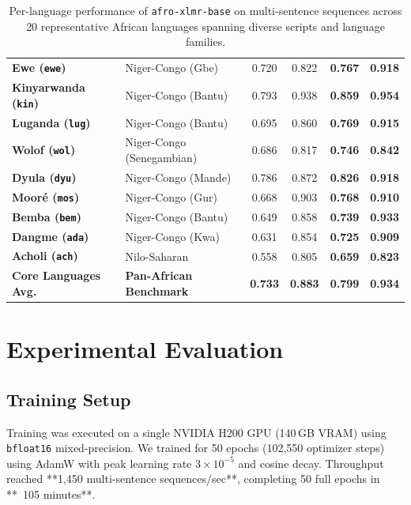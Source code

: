 \documentclass[11pt,a4paper]{article}
\begin{document}
\begin{table}[t]
\begin{tabularx}{\linewidth}{llcccc}
\textbf{Ewe (\texttt{ewe})} & Niger-Congo (Gbe) & 0.720 & 0.822 & \textbf{0.767} & \textbf{0.918} \\
\textbf{Kinyarwanda (\texttt{kin})} & Niger-Congo (Bantu) & 0.793 & 0.938 & \textbf{0.859} & \textbf{0.954} \\
\textbf{Luganda (\texttt{lug})} & Niger-Congo (Bantu) & 0.695 & 0.860 & \textbf{0.769} & \textbf{0.915} \\
\textbf{Wolof (\texttt{wol})} & Niger-Congo (Senegambian) & 0.686 & 0.817 & \textbf{0.746} & \textbf{0.842} \\
\textbf{Dyula (\texttt{dyu})} & Niger-Congo (Mande) & 0.786 & 0.872 & \textbf{0.826} & \textbf{0.918} \\
\textbf{Moor\'{e} (\texttt{mos})} & Niger-Congo (Gur) & 0.668 & 0.903 & \textbf{0.768} & \textbf{0.910} \\
\textbf{Bemba (\texttt{bem})} & Niger-Congo (Bantu) & 0.649 & 0.858 & \textbf{0.739} & \textbf{0.933} \\
\textbf{Dangme (\texttt{ada})} & Niger-Congo (Kwa) & 0.631 & 0.854 & \textbf{0.725} & \textbf{0.909} \\
\textbf{Acholi (\texttt{ach})} & Nilo-Saharan & 0.558 & 0.805 & \textbf{0.659} & \textbf{0.823} \\
\midrule
\textbf{Core Languages Avg.} & \textbf{Pan-African Benchmark} & \textbf{0.733} & \textbf{0.883} & \textbf{0.799} & \textbf{0.934} \\
\bottomrule
\end{tabularx}
\caption{Per-language performance of \texttt{afro-xlmr-base} on multi-sentence sequences across 20 representative African languages spanning diverse scripts and language families.}
\label{tab:results}
\end{table}

\section{Experimental Evaluation}

\subsection{Training Setup}
Training was executed on a single NVIDIA H200 GPU (140\,GB VRAM) using \texttt{bfloat16} mixed-precision. We trained for 50 epochs (102,550 optimizer steps) using AdamW with peak learning rate $3 \times 10^{-5}$ and cosine decay. Throughput reached **1,450 multi-sentence sequences/sec**, completing 50 full epochs in **~105 minutes**.
\end{document}
